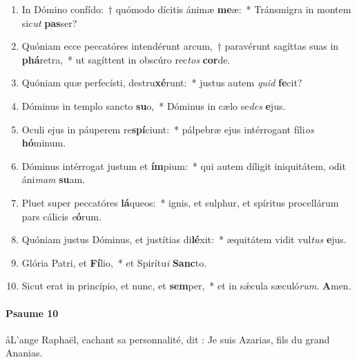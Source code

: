 \documentclass[twoside]{article}
\begin{document}
\begin{paracol}[1]{2}
\begin{enumerate}[wide, itemsep=0mm, labelwidth=!, labelindent=0pt, label=\color{gregoriocolor}\theenumi]
\item In Dómino confído:~† quómodo dícitis ánimæ \textbf{me}æ:~* Tránsmigra in montem sic\textit{ut} \textbf{pas}ser?
\item Quóniam ecce peccatóres intendérunt arcum,~† paravérunt sagíttas suas in \textbf{phá}retra,~* ut sagíttent in obscúro rec\textit{tos} \textbf{cor}de.
\item Quóniam quæ perfecísti, destru\textbf{xé}runt:~* justus autem \textit{quid} \textbf{fe}cit?
\item Dóminus in templo sancto \textbf{su}o,~* Dóminus in cælo se\textit{des} \textbf{e}jus.
\item Oculi ejus in páuperem re\textbf{spí}ciunt:~* pálpebræ ejus intérrogant fíli\textit{os} \textbf{hó}minum.
\item Dóminus intérrogat justum et \textbf{ím}pium:~* qui autem díligit iniquitátem, odit áni\textit{mam} \textbf{su}am.
\item Pluet super peccatóres \textbf{lá}queos:~* ignis, et sulphur, et spíritus procellárum pars cálicis \textit{e}\textbf{ó}rum.
\item Quóniam justus Dóminus, et justítias di\textbf{lé}xit:~* æquitátem vidit vul\textit{tus} \textbf{e}jus.
\item Glória Patri, et \textbf{Fí}lio,~* et Spirítu\textit{i} \textbf{Sanc}to.
\item Sicut erat in princípio, et nunc, et \textbf{sem}per,~* et in sǽcula sæculó\textit{rum}. \textbf{A}men.
\end{enumerate}

\switchcolumn

\paragraph{Psaume 10}
\aa L’ange Raphaël, cachant sa personnalité, dit : Je suis Azarias, fils du grand Ananias.




\end{paracol}
\end{document}
